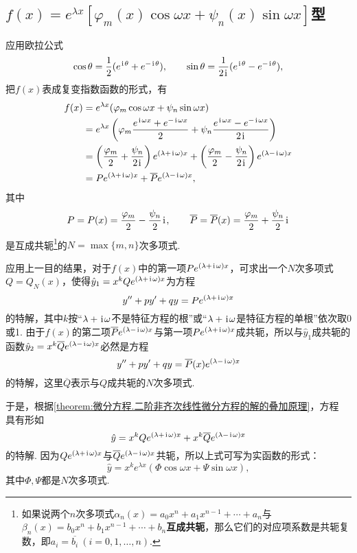 \subsection{\texorpdfstring{\(f(x) = e^{\lambda x} [ \varphi_m(x) \cos\omega x + \psi_n(x) \sin \omega x ]\)型}{第二类：指数函数与广义三角函数的乘积}}
应用欧拉公式\[
\cos\theta = \frac{1}{2}(e^{\kern1pt\mathrm{i}\kern1pt\theta}+e^{-\kern1pt\mathrm{i}\kern1pt\theta}),
\qquad
\sin\theta = \frac{1}{2\kern1pt\mathrm{i}\kern1pt}(e^{\kern1pt\mathrm{i}\kern1pt\theta}-e^{-\kern1pt\mathrm{i}\kern1pt\theta}),
\]把\(f(x)\)表成复变指数函数的形式，有\begin{align*}
f(x) &= e^{\lambda x} ( \varphi_m \cos \omega x + \psi_n \sin \omega x ) \\
&= e^{\lambda x} \left(
\varphi_m \frac{e^{\kern1pt\mathrm{i}\kern1pt\omega x}+e^{-\kern1pt\mathrm{i}\kern1pt\omega x}}{2}
+ \psi_n \frac{e^{\kern1pt\mathrm{i}\kern1pt\omega x}-e^{-\kern1pt\mathrm{i}\kern1pt\omega x}}{2\kern1pt\mathrm{i}\kern1pt}
\right) \\
&= \left(\frac{\varphi_m}{2}+\frac{\psi_n}{2\kern1pt\mathrm{i}\kern1pt}\right) e^{(\lambda+\kern1pt\mathrm{i}\kern1pt\omega)x}
+ \left(\frac{\varphi_m}{2}-\frac{\psi_n}{2\kern1pt\mathrm{i}\kern1pt}\right) e^{(\lambda-\kern1pt\mathrm{i}\kern1pt\omega)x} \\
&= P e^{(\lambda+\kern1pt\mathrm{i}\kern1pt\omega)x}
+ \overline{P} e^{(\lambda-\kern1pt\mathrm{i}\kern1pt\omega)x},
\end{align*}
其中\[
P = P(x) = \frac{\varphi_m}{2} - \frac{\psi_n}{2}\kern1pt\mathrm{i}\kern1pt,
\qquad
\overline{P} = \overline{P}(x) = \frac{\varphi_m}{2}+\frac{\psi_n}{2}\kern1pt\mathrm{i}\kern1pt
\]是互成共轭\footnote{如果说两个\(n\)次多项式\(\alpha_n(x) = a_0 x^n + a_1 x^{n-1} + \dotsb + a_n\)与\(\beta_n(x) = b_0 x^n + b_1 x^{n-1} + \dotsb + b_n\)\textbf{互成共轭}，那么它们的对应项系数是共轭复数，即\(a_i = \overline{b_i}\ (i=0,1,\dotsc,n)\).}的\(N = \max\{m,n\}\)次多项式.

应用上一目的结果，对于\(f(x)\)中的第一项\(P e^{(\lambda+\kern1pt\mathrm{i}\kern1pt\omega)x}\)，可求出一个\(N\)次多项式\(Q = Q_N(x)\)，使得\(\hat{y}_1 = x^k Q e^{(\lambda+\kern1pt\mathrm{i}\kern1pt\omega)x}\)为方程\[
y'' + p y' + q y = P e^{(\lambda+\kern1pt\mathrm{i}\kern1pt\omega)x}
\]的特解，其中\(k\)按“\(\lambda+\kern1pt\mathrm{i}\kern1pt\omega\)不是特征方程的根”或“\(\lambda+\kern1pt\mathrm{i}\kern1pt\omega\)是特征方程的单根”依次取0或1.
由于\(f(x)\)的第二项\(\overline{P} e^{(\lambda-\kern1pt\mathrm{i}\kern1pt\omega)x}\)与第一项\(P e^{(\lambda+\kern1pt\mathrm{i}\kern1pt\omega)x}\)成共轭，所以与\(\hat{y}_1\)成共轭的函数\(\hat{y}_2 = x^k \overline{Q} e^{(\lambda-\kern1pt\mathrm{i}\kern1pt\omega)x}\)必然是方程\[
y'' + p y' + q y = \overline{P}(x) e^{(\lambda-\kern1pt\mathrm{i}\kern1pt\omega)x}
\]的特解，这里\(\overline{Q}\)表示与\(Q\)成共轭的\(N\)次多项式.

于是，根据\cref{theorem:微分方程.二阶非齐次线性微分方程的解的叠加原理}，方程  具有形如\[
\hat{y} = x^k Q e^{(\lambda+\kern1pt\mathrm{i}\kern1pt\omega)x} + x^k \overline{Q} e^{(\lambda-\kern1pt\mathrm{i}\kern1pt\omega)x}
\]的特解.
因为\(Q e^{(\lambda+\kern1pt\mathrm{i}\kern1pt\omega)x}\)与\(\overline{Q} e^{(\lambda-\kern1pt\mathrm{i}\kern1pt\omega)x}\)共轭，所以上式可写为实函数的形式：\begin{equation}\label{equation:微分方程.二阶常系数齐次线性微分方程.特解2}
\hat{y} = x^k e^{\lambda x} (\Phi \cos\omega x + \Psi \sin\omega x),
\end{equation}其中\(\Phi,\Psi\)都是\(N\)次多项式.

